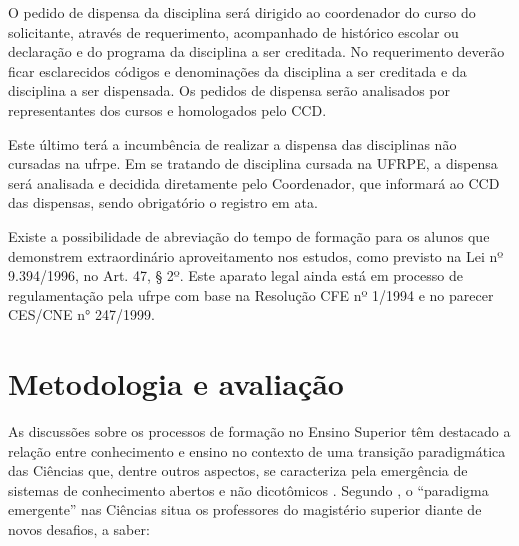 \documentclass[
	12pt,				%
	openright,			%
  oneside,     %
	a4paper,			%
 hyphens,
	chapter=TITLE,		%
	english,			%
	french,				%
	spanish,			%
	brazil				%
	]{abntex2}
\begin{document}
O pedido de dispensa da disciplina será dirigido ao coordenador do curso do solicitante, através de requerimento, acompanhado de histórico escolar ou declaração e do programa da disciplina a ser creditada. No requerimento deverão ficar esclarecidos códigos e denominações da disciplina a ser creditada e da disciplina a ser dispensada. Os pedidos de dispensa serão analisados por representantes dos cursos e homologados pelo CCD.

Este último terá a incumbência de realizar a dispensa das disciplinas não cursadas na \acrshort{ufrpe}. Em se tratando de disciplina cursada na UFRPE, a dispensa será analisada e decidida diretamente pelo Coordenador, que informará ao CCD das dispensas, sendo obrigatório o registro em ata.

Existe a possibilidade de abreviação do tempo de formação para os alunos que demonstrem extraordinário aproveitamento nos estudos, como previsto na Lei nº 9.394/1996, no Art. 47, § 2º. Este aparato legal ainda está em processo de regulamentação pela \acrshort{ufrpe} com base na Resolução CFE nº 1/1994 e no parecer CES/CNE n° 247/1999.





%
%




\chapter{Metodologia e avaliação}
\label{cap_metodologia_e_avaliacao}

As discussões sobre os processos de formação no Ensino Superior têm destacado a relação entre conhecimento e ensino no contexto de uma transição paradigmática das Ciências que, dentre outros aspectos, se caracteriza pela emergência de sistemas de conhecimento abertos e não dicotômicos \cite{santos1988discurso}. Segundo , o ``paradigma emergente'' nas Ciências situa os professores do magistério superior diante de novos desafios, a saber:
\end{document}

